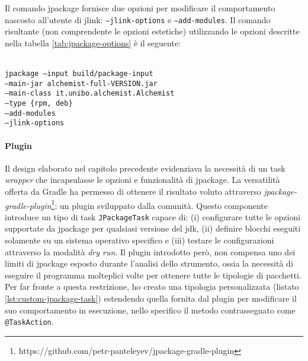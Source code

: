 Il comando jpackage fornisce due opzioni per modificare il comportamento nascosto all'utente di jlink: \texttt{--jlink-options} e \texttt{--add-modules}. Il comando risultante (non comprendente le opzioni estetiche) utilizzando le opzioni descritte nella tabella \ref{tab:jpackage-options} è il seguente:

\texttt{\\ jpackage --input build/package-input \\ \tab\tab --main-jar alchemist-full-VERSION.jar \\ \tab\tab --main-class it.unibo.alchemist.Alchemist \\ \tab\tab --type \{rpm, deb\} \\ \tab\tab --add-modules \\ \tab\tab --jlink-options \\}



\paragraph{Plugin} Il design elaborato nel capitolo precedente evidenziava la necessità di un task \textit{wrapper} che incapsulasse le opzioni e funzionalità di jpackage. La versatilità offerta da Gradle ha permesso di ottenere il risultato voluto attraverso \textit{jpackage-gradle-plugin}\footnote{https://github.com/petr-panteleyev/jpackage-gradle-plugin}: un plugin sviluppato dalla comunità. Questo componente introduce un tipo di task \texttt{JPackageTask} capace di: (i) configurare tutte le opzioni supportate da jpackage per qualsiasi versione del \ac{jdk}, (ii) definire blocchi eseguiti solamente su un sistema operativo specifico e (iii) testare le configurazioni attraverso la modalità \textit{dry run}. Il plugin introdotto però, non compensa uno dei limiti di jpackage esposto durante l'analisi dello strumento, ossia la necessità di eseguire il programma molteplici volte per ottenere tutte le tipologie di pacchetti. Per far fronte a questa restrizione, ho creato una tipologia personalizzata (listato \ref{lst:custom-jpackage-task}) estendendo quella fornita dal plugin per modificare il suo comportamento in esecuzione, nello specifico il metodo contrassegnato come \texttt{@TaskAction}.

